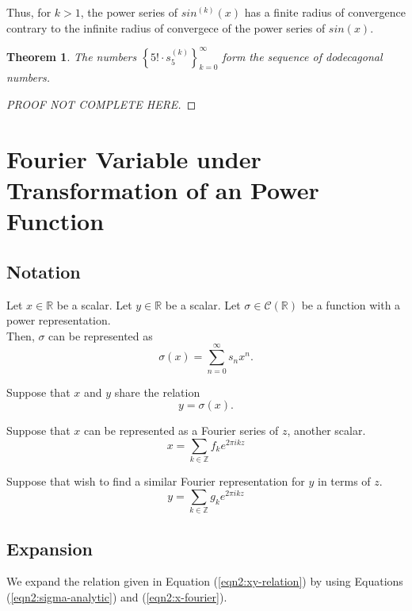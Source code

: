 \documentclass{article}
\newtheorem{theorem}{Theorem}
\begin{document}
    Thus, for $k > 1$, the power series of $sin^{(k)}(x)$ has a finite radius of convergence contrary to the infinite radius of convergece of the power series of $sin(x)$.

    \begin{theorem}
        The numbers $\left\{5! \cdot s_{5}^{(k)}\right\}_{k=0}^{\infty}$ form the sequence of dodecagonal numbers.
    \end{theorem}
    \begin{proof}
        [PROOF NOT COMPLETE HERE]
    \end{proof}

    \section{Fourier Variable under Transformation of an Power Function}

    \subsection{Notation}
    Let $x \in \mathbb{R}$ be a scalar. Let $y \in \mathbb{R}$ be a scalar. Let $\sigma \in \mathcal{C}(\mathbb{R})$ be a function with a power representation.\\

    Then, $\sigma$ can be represented as
    \begin{equation}
        \sigma(x) = \sum_{n=0}^{\infty} s_n x^n.
        \label{eqn2:sigma-analytic}
    \end{equation}

    Suppose that $x$ and $y$ share the relation
    \begin{equation}
        y = \sigma(x).
        \label{eqn2:xy-relation}
    \end{equation}

    Suppose that $x$ can be represented as a Fourier series of $z$, another scalar.
    \begin{equation}
        x = \sum_{k \in \mathbb{Z}} f_k e^{2\pi i k z}
        \label{eqn2:x-fourier}
    \end{equation}

    Suppose that wish to find a similar Fourier representation for $y$ in terms of $z$.
    \begin{equation}
        y = \sum_{k \in \mathbb{Z}} g_k e^{2\pi i k z}
        \label{eqn2:y-fourier}
    \end{equation}

    \subsection{Expansion}
    We expand the relation given in Equation (\ref{eqn2:xy-relation}) by using Equations (\ref{eqn2:sigma-analytic}) and (\ref{eqn2:x-fourier}).
\end{document}
